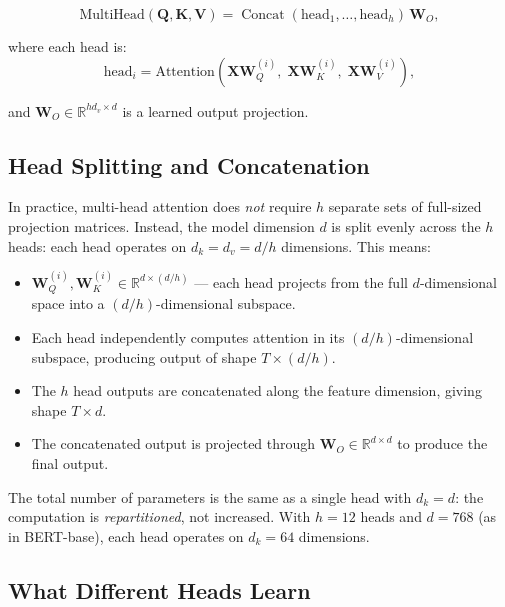 \begin{equation}
\text{MultiHead}(\mathbf{Q}, \mathbf{K}, \mathbf{V}) = \operatorname{Concat}(\text{head}_1, \ldots, \text{head}_h)\,\mathbf{W}_O,
\label{eq:multihead}
\end{equation}

where each head is:
\begin{equation}
\text{head}_i = \text{Attention}(\mathbf{X}\mathbf{W}_Q^{(i)},\; \mathbf{X}\mathbf{W}_K^{(i)},\; \mathbf{X}\mathbf{W}_V^{(i)}),
\end{equation}

and $\mathbf{W}_O \in \mathbb{R}^{hd_v \times d}$ is a learned output projection.

\subsection{Head Splitting and Concatenation}

In practice, multi-head attention does \emph{not} require $h$ separate sets of full-sized projection matrices. Instead, the model dimension $d$ is split evenly across the $h$ heads: each head operates on $d_k = d_v = d / h$ dimensions. This means:

\begin{itemize}[leftmargin=1.5em]
  \item $\mathbf{W}_Q^{(i)}, \mathbf{W}_K^{(i)} \in \mathbb{R}^{d \times (d/h)}$ --- each head projects from the full $d$-dimensional space into a $(d/h)$-dimensional subspace.
  \item Each head independently computes attention in its $(d/h)$-dimensional subspace, producing output of shape $T \times (d/h)$.
  \item The $h$ head outputs are concatenated along the feature dimension, giving shape $T \times d$.
  \item The concatenated output is projected through $\mathbf{W}_O \in \mathbb{R}^{d \times d}$ to produce the final output.
\end{itemize}

The total number of parameters is the same as a single head with $d_k = d$: the computation is \emph{repartitioned}, not increased. With $h = 12$ heads and $d = 768$ (as in BERT-base), each head operates on $d_k = 64$ dimensions.

\subsection{What Different Heads Learn}

